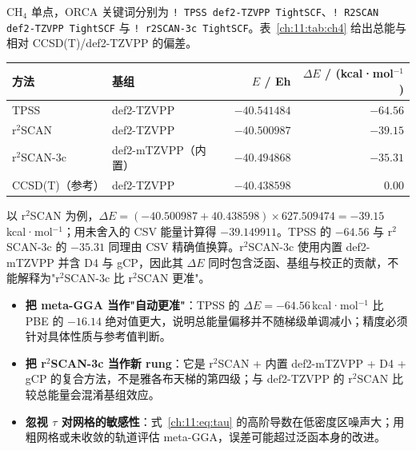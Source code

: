 \begin{ch4box}
CH$_4$ 单点，ORCA 关键词分别为 \texttt{! TPSS def2-TZVPP TightSCF}、\texttt{! R2SCAN def2-TZVPP TightSCF} 与 \texttt{! r2SCAN-3c TightSCF}。表~\ref{ch:11:tab:ch4} 给出总能与相对 CCSD(T)/def2-TZVPP 的偏差。

\begin{center}
\small
\begin{tabular}{@{}llrr@{}}
\toprule
方法 & 基组 & $E$ / Eh & $\Delta E$ / (kcal·mol$^{-1}$) \\
\midrule
TPSS        & def2-TZVPP & $-40.541484$ & $-64.56$ \\
r$^2$SCAN   & def2-TZVPP & $-40.500987$ & $-39.15$ \\
r$^2$SCAN-3c & def2-mTZVPP（内置） & $-40.494868$ & $-35.31$ \\
\midrule
CCSD(T)（参考） & def2-TZVPP & $-40.438598$ & $0.00$ \\
\bottomrule
\end{tabular}
\label{ch:11:tab:ch4}
\end{center}

以 r$^2$SCAN 为例，$\Delta E=(-40.500987+40.438598)\times 627.509474=-39.15$\,kcal·mol$^{-1}$；用未舍入的 CSV 能量计算得 $-39.149911$。TPSS 的 $-64.56$ 与 r$^2$SCAN-3c 的 $-35.31$ 同理由 CSV 精确值换算。r$^2$SCAN-3c 使用内置 def2-mTZVPP 并含 D4 与 gCP，因此其 $\Delta E$ 同时包含泛函、基组与校正的贡献，不能解释为"r$^2$SCAN-3c 比 r$^2$SCAN 更准"。
\end{ch4box}

\begin{pitfall}
\begin{itemize}
  \item \textbf{把 meta-GGA 当作"自动更准"}：TPSS 的 $\Delta E=-64.56$\,kcal·mol$^{-1}$ 比 PBE 的 $-16.14$ 绝对值更大，说明总能量偏移并不随梯级单调减小；精度必须针对具体性质与参考值判断。
  \item \textbf{把 r$^2$SCAN-3c 当作新 rung}：它是 r$^2$SCAN + 内置 def2-mTZVPP + D4 + gCP 的复合方法，不是雅各布天梯的第四级；与 def2-TZVPP 的 r$^2$SCAN 比较总能量会混淆基组效应。
  \item \textbf{忽视 $\tau$ 对网格的敏感性}：式~\eqref{ch:11:eq:tau} 的高阶导数在低密度区噪声大；用粗网格或未收敛的轨道评估 meta-GGA，误差可能超过泛函本身的改进。
\end{itemize}
\end{pitfall}

